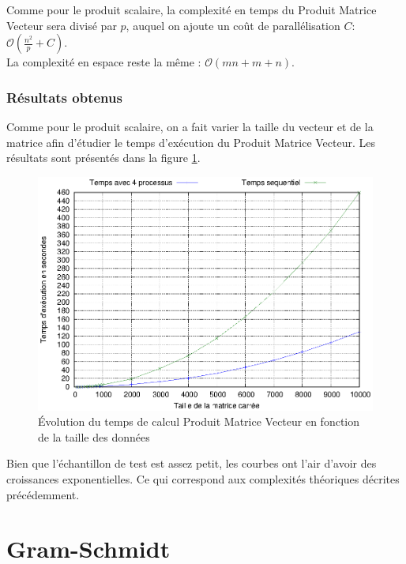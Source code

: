 \documentclass[a4paper]{article}
\begin{document}
Comme pour le produit scalaire, la complexité en temps du Produit Matrice Vecteur sera divisé par $p$, auquel on ajoute un coût de parallélisation $C$: \textbf{$\mathcal{O}(\frac{n^2}{p} + C)$}.\\
La complexité en espace reste la même : \textbf{$\mathcal{O}(mn + m + n)$}.



\section{Résultats obtenus}

Comme pour le produit scalaire, on a fait varier la taille du vecteur et de la matrice afin d'étudier le temps d'exécution du Produit Matrice Vecteur. Les résultats sont présentés dans la figure \ref{fig:courbe_pmv}.

\begin{figure}[h]
	\begin{center}
		\includegraphics[scale=0.80]{Courbes/pmv_temps_taille.eps}
	\end{center}
   	\caption{Évolution du temps de calcul Produit Matrice Vecteur en fonction de la taille des données}
	\label{fig:courbe_pmv}
\end{figure}

\FloatBarrier

Bien que l'échantillon de test est assez petit, les courbes ont l'air d'avoir des croissances exponentielles. Ce qui correspond aux complexités théoriques décrites précédemment.

\part{Gram-Schmidt}
\end{document}
